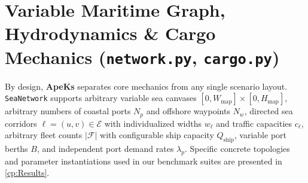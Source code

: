 \documentclass[11pt,a4paper,oneside]{report}
\begin{document}
\section[Graph, Hydrodynamics \& Cargo]{Variable Maritime Graph, Hydrodynamics \& Cargo Mechanics (\texttt{network.py}, \texttt{cargo.py})}
By design, \textbf{ApeKs} separates core mechanics from any single scenario layout. \texttt{SeaNetwork} supports arbitrary variable sea canvases $[0, W_{\text{map}}] \times [0, H_{\text{map}}]$, arbitrary numbers of coastal ports $N_p$ and offshore waypoints $N_w$, directed sea corridors $\ell = (u,v) \in \mathcal{E}$ with individualized widths $w_\ell$ and traffic capacities $c_\ell$, arbitrary fleet counts $|\mathcal{F}|$ with configurable ship capacity $Q_{\text{ship}}$, variable port berths $B$, and independent port demand rates $\lambda_p$. Specific concrete topologies and parameter instantiations used in our benchmark suites are presented in \autoref{cp:Results}.
\end{document}
